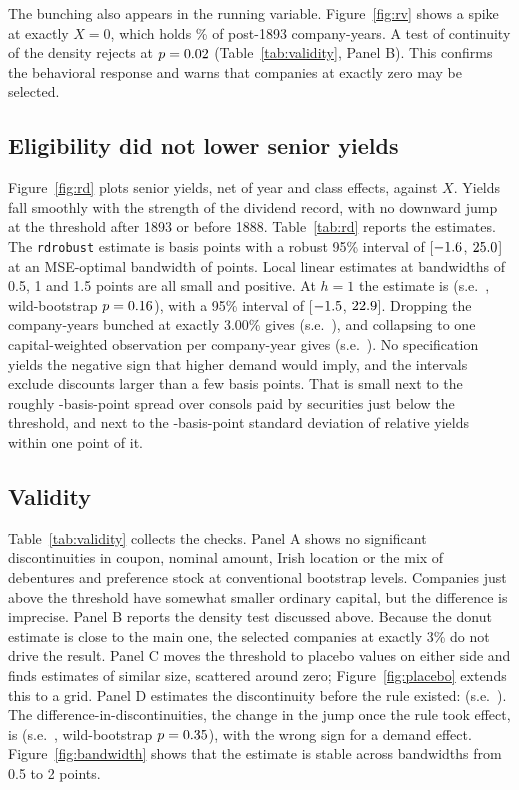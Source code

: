 \documentclass[11pt]{article}
\begin{document}
The bunching also appears in the running variable. Figure~\ref{fig:rv} shows a spike at exactly $X = 0$, which holds \massZero\% of post-1893 company-years. A test of continuity of the density rejects at $p = 0.02$ (Table~\ref{tab:validity}, Panel B). This confirms the behavioral response and warns that companies at exactly zero may be selected.

\subsection{Eligibility did not lower senior yields}

Figure~\ref{fig:rd} plots senior yields, net of year and class effects, against $X$. Yields fall smoothly with the strength of the dividend record, with no downward jump at the threshold after 1893 or before 1888. Table~\ref{tab:rd} reports the estimates. The \texttt{rdrobust} estimate is \rdTau{} basis points with a robust 95\% interval of [$-1.6$, $25.0$] at an MSE-optimal bandwidth of \rdH{} points. Local linear estimates at bandwidths of 0.5, 1 and 1.5 points are all small and positive. At $h = 1$ the estimate is \rdTauHone{} (s.e.\ \rdSEHone, wild-bootstrap $p = 0.16$), with a 95\% interval of [$-1.5$, $22.9$]. Dropping the company-years bunched at exactly 3.00\% gives \rdTauDonut{} (s.e.\ \rdSEDonut), and collapsing to one capital-weighted observation per company-year gives \rdTauCY{} (s.e.\ \rdSECY). No specification yields the negative sign that higher demand would imply, and the intervals exclude discounts larger than a few basis points. That is small next to the roughly \meanSpreadNotElig-basis-point spread over consols paid by securities just below the threshold, and next to the \sdRelBand-basis-point standard deviation of relative yields within one point of it.

\subsection{Validity}

Table~\ref{tab:validity} collects the checks. Panel A shows no significant discontinuities in coupon, nominal amount, Irish location or the mix of debentures and preference stock at conventional bootstrap levels. Companies just above the threshold have somewhat smaller ordinary capital, but the difference is imprecise. Panel B reports the density test discussed above. Because the donut estimate is close to the main one, the selected companies at exactly 3\% do not drive the result. Panel C moves the threshold to placebo values on either side and finds estimates of similar size, scattered around zero; Figure~\ref{fig:placebo} extends this to a grid. Panel D estimates the discontinuity before the rule existed: \preTau{} (s.e.\ \preSE). The difference-in-discontinuities, the change in the jump once the rule took effect, is \didTau{} (s.e.\ \didSE, wild-bootstrap $p = 0.35$), with the wrong sign for a demand effect. Figure~\ref{fig:bandwidth} shows that the estimate is stable across bandwidths from 0.5 to 2 points.
\end{document}
